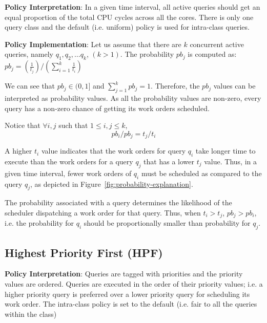 \textbf{Policy Interpretation}: In a given time interval, all active queries should get an equal proportion of the total CPU cycles across all the cores.
There is only one query class and the default (i.e. uniform) policy is used for intra-class queries. 

\textbf{Policy Implementation}: Let us assume that there are $k$ concurrent active queries, namely $q_{1}, q_{2}, \ldots q_{k}$, $(k > 1)$. 
The probability $pb_{j}$ is computed as:
$pb_{j} = (\frac{1}{t_{j}})/(\sum\limits_{i=1}^{k}\frac{1}{t_{i}})$

We can see that $pb_{j} \in (0, 1]$ and $\sum\limits_{j=1}^{k}pb_{j} = 1$. 
Therefore, the $pb_{j}$ values can be interpreted as probability values. 
As all the probability values are non-zero, every query has a non-zero chance of getting its work orders scheduled. 

Notice that $\forall i, j$ such that $1 \leq i, j \leq k$, 
$$pb_{i}/pb_{j} = t_{j}/t_{i}$$

A higher $t_{i}$ value indicates that the work orders for query $q_{i}$ take longer time to execute than the work orders for a query $q_{j}$ that has a lower $t_{j}$ value. 
Thus, in a given time interval, fewer work orders of $q_{i}$ must be scheduled as compared to the query $q_{j}$, as depicted in Figure~\ref{fig:probability-explanation}.

The probability associated with a query determines the likelihood of the scheduler dispatching a work order for that query.
Thus, when $t_i > t_j$, $pb_j > pb_i$, i.e.  the probability for $q_{i}$ should be proportionally smaller than probability for $q_{j}$.

\subsection{Highest Priority First (HPF)}\label{ssec:hpf}
\textbf{Policy Interpretation}: Queries are tagged with priorities and the priority values are ordered. 
Queries are executed in the order of their priority values; i.e. a higher priority query is preferred over a lower priority query for scheduling its work order. 
The intra-class policy is set to the default (i.e. fair to all the queries within the class)

